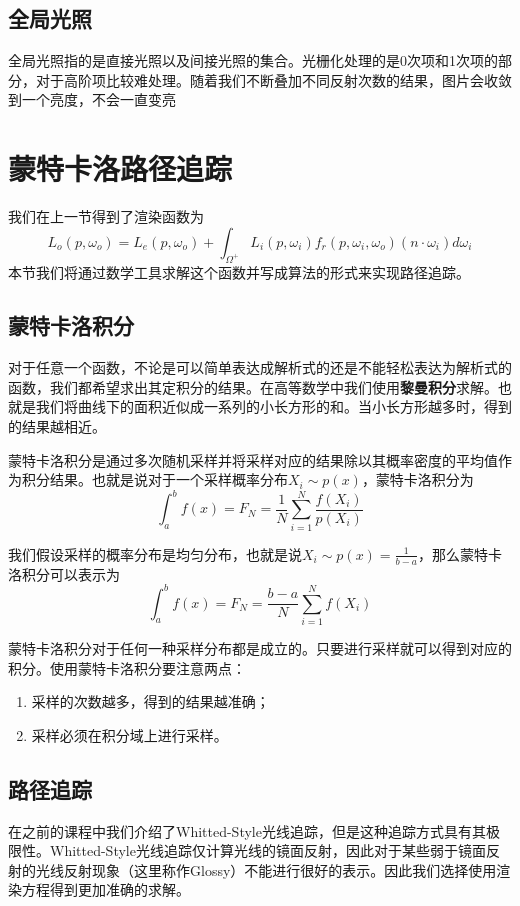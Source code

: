 \documentclass[openany]{progbookcn}
\begin{document}
\section{全局光照}
全局光照指的是直接光照以及间接光照的集合。光栅化处理的是0次项和1次项的部分，对于高阶项比较难处理。随着我们不断叠加不同反射次数的结果，图片会收敛到一个亮度，不会一直变亮

\chapter{蒙特卡洛路径追踪}

我们在上一节得到了渲染函数为
\begin{equation}
	L_o(p,\omega_o)=L_e(p,\omega_o)+\int_{\Omega^+}L_i(p,\omega_i)f_r(p,\omega_i,\omega_o)(n\cdot \omega_i)d\omega_i
\end{equation}
本节我们将通过数学工具求解这个函数并写成算法的形式来实现路径追踪。

\section{蒙特卡洛积分}

对于任意一个函数，不论是可以简单表达成解析式的还是不能轻松表达为解析式的函数，我们都希望求出其定积分的结果。在高等数学中我们使用\textbf{黎曼积分}求解。也就是我们将曲线下的面积近似成一系列的小长方形的和。当小长方形越多时，得到的结果越相近。

蒙特卡洛积分是通过多次随机采样并将采样对应的结果除以其概率密度的平均值作为积分结果。也就是说对于一个采样概率分布$X_i\sim p(x)$，蒙特卡洛积分为
\begin{equation}
	\int_a^b f(x) = F_N=\frac{1}{N}\sum_{i=1}^N\frac{f(X_i)}{p(X_i)}
\end{equation}

我们假设采样的概率分布是均匀分布，也就是说$X_i\sim p(x)=\frac{1}{b-a}$，那么蒙特卡洛积分可以表示为
\begin{equation}
	\int_a^b f(x) = F_N=\frac{b-a}{N}\sum_{i=1}^Nf(X_i)
\end{equation}

蒙特卡洛积分对于任何一种采样分布都是成立的。只要进行采样就可以得到对应的积分。使用蒙特卡洛积分要注意两点：
\begin{enumerate}
	\item 采样的次数越多，得到的结果越准确；
	\item 采样必须在积分域上进行采样。
\end{enumerate}

\section{路径追踪}
在之前的课程中我们介绍了Whitted-Style光线追踪，但是这种追踪方式具有其极限性。Whitted-Style光线追踪仅计算光线的镜面反射，因此对于某些弱于镜面反射的光线反射现象（这里称作Glossy）不能进行很好的表示。因此我们选择使用渲染方程得到更加准确的求解。
\end{document}
